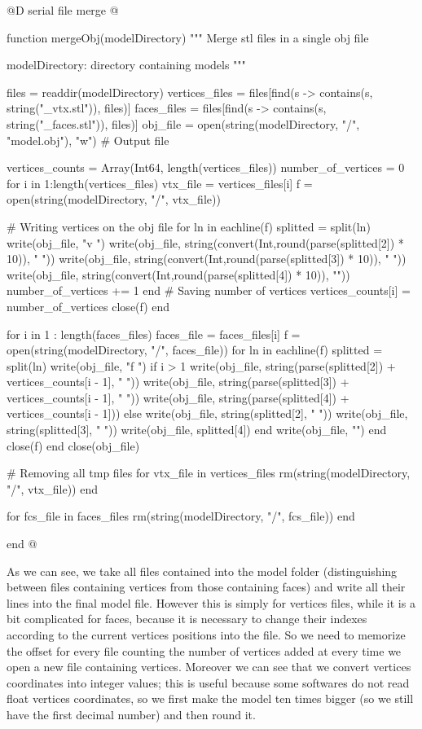 \documentclass[11pt,oneside]{article}	%
\begin{document}
@D serial file merge
@{function mergeObj(modelDirectory)
  """
  Merge stl files in a single obj file

  modelDirectory: directory containing models
  """

  files = readdir(modelDirectory)
  vertices_files = files[find(s -> contains(s, string("_vtx.stl")), files)]
  faces_files = files[find(s -> contains(s, string("_faces.stl")), files)]
  obj_file = open(string(modelDirectory, "/", "model.obj"), "w") # Output file

  vertices_counts = Array(Int64, length(vertices_files))
  number_of_vertices = 0
  for i in 1:length(vertices_files)
    vtx_file = vertices_files[i]
    f = open(string(modelDirectory, "/", vtx_file))

    # Writing vertices on the obj file
    for ln in eachline(f)
      splitted = split(ln)
      write(obj_file, "v ")
      write(obj_file, string(convert(Int,round(parse(splitted[2]) * 10)), " "))
      write(obj_file, string(convert(Int,round(parse(splitted[3]) * 10)), " "))
      write(obj_file, string(convert(Int,round(parse(splitted[4]) * 10)), "\n"))
      number_of_vertices += 1
    end
    # Saving number of vertices
    vertices_counts[i] = number_of_vertices
    close(f)
  end

  for i in 1 : length(faces_files)
    faces_file = faces_files[i]
    f = open(string(modelDirectory, "/", faces_file))
    for ln in eachline(f)
      splitted = split(ln)
      write(obj_file, "f ")
      if i > 1
        write(obj_file, string(parse(splitted[2]) + vertices_counts[i - 1], " "))
        write(obj_file, string(parse(splitted[3]) + vertices_counts[i - 1], " "))
        write(obj_file, string(parse(splitted[4]) + vertices_counts[i - 1]))
      else
        write(obj_file, string(splitted[2], " "))
        write(obj_file, string(splitted[3], " "))
        write(obj_file, splitted[4])
      end
      write(obj_file, "\n")
    end
    close(f)
  end
  close(obj_file)

  # Removing all tmp files
  for vtx_file in vertices_files
    rm(string(modelDirectory, "/", vtx_file))
  end

  for fcs_file in faces_files
    rm(string(modelDirectory, "/", fcs_file))
  end

end @}

As we can see, we take all files contained into the model folder (distinguishing between files containing vertices from those containing faces) and write all their lines into the final model file. However this is simply for vertices files, while it is a bit complicated for faces, because it is necessary to change their indexes according to the current vertices positions into the file. So we need to memorize the offset for every file counting the number of vertices added at every time we open a new file containing vertices. Moreover we can see that we convert vertices coordinates into integer values; this is useful because some softwares do not read float vertices coordinates, so we first make the model ten times bigger (so we still have the first decimal number) and then round it.
\end{document}
